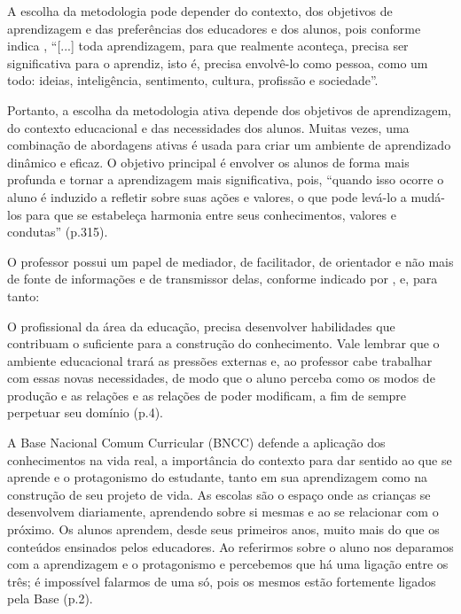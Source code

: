 A escolha da metodologia pode depender do contexto, dos objetivos de aprendizagem e das preferências dos educadores e dos alunos, pois conforme indica , ``[...] toda aprendizagem, para que realmente aconteça, precisa ser significativa para o aprendiz, isto é, precisa envolvê-lo como pessoa, como um todo: ideias, inteligência, sentimento, cultura, profissão e sociedade''.

Portanto, a escolha da metodologia ativa depende dos objetivos de aprendizagem, do contexto educacional e das necessidades dos alunos. Muitas vezes, uma combinação de abordagens ativas é usada para criar um ambiente de aprendizado dinâmico e eficaz. O objetivo principal é envolver os alunos de forma mais profunda e tornar a aprendizagem mais significativa, pois, ``quando isso ocorre o aluno é induzido a refletir sobre suas ações e valores, o que pode levá-lo a mudá-los para que se estabeleça harmonia entre seus conhecimentos, valores e condutas'' \cite{FRASSON2019} (p.315).

O professor possui um papel de mediador, de facilitador, de orientador e não mais de fonte de informações e de transmissor delas, conforme indicado por 
, e, para tanto:

\begin{citacao}
    O profissional da área da educação, precisa desenvolver habilidades que contribuam o suficiente para a construção do conhecimento. Vale lembrar que o ambiente educacional trará as pressões externas e, ao professor cabe trabalhar com essas novas necessidades, de modo que o aluno perceba como os modos de produção e as relações e as relações de poder modificam, a fim de sempre perpetuar seu domínio \cite{NathBragaTeixeira2017} (p.4).
\end{citacao}

A Base Nacional Comum Curricular (BNCC) defende a aplicação dos conhecimentos na vida real, a importância do contexto para dar sentido ao que se aprende e o protagonismo do estudante, tanto em sua aprendizagem como na construção de seu projeto de vida. As escolas são o espaço onde as crianças se desenvolvem diariamente, aprendendo sobre si mesmas e ao se relacionar com o próximo. Os alunos aprendem, desde seus primeiros anos, muito mais do que os conteúdos ensinados pelos educadores. Ao referirmos sobre o aluno nos deparamos com a aprendizagem e o protagonismo e percebemos que há uma ligação entre os três; é impossível falarmos de uma só, pois os mesmos estão fortemente ligados pela Base \cite{FRANCESCONI2019} (p.2).

